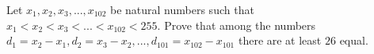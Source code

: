 Let $x_1,x_2,x_3,...,x_{102}$ be natural numbers such that $x_1<x_2<x_3<...<x_{102}<255$.
Prove that among the numbers $d_1=x_2-x_1, d_2=x_3-x_2, ..., d_{101}=x_{102}-x_{101}$ there are at least $26$ equal.